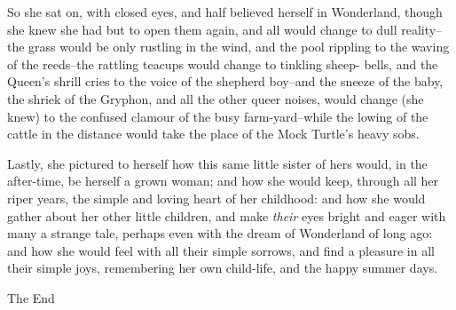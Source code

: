   So she sat on, with closed eyes, and half believed herself in
Wonderland, though she knew she had but to open them again, and
all would change to dull reality--the grass would be only
rustling in the wind, and the pool rippling to the waving of the
reeds--the rattling teacups would change to tinkling sheep-
bells, and the Queen's shrill cries to the voice of the shepherd
boy--and the sneeze of the baby, the shriek of the Gryphon, and
all the other queer noises, would change (she knew) to the
confused clamour of the busy farm-yard--while the lowing of the
cattle in the distance would take the place of the Mock Turtle's
heavy sobs.

  Lastly, she pictured to herself how this same little sister of
hers would, in the after-time, be herself a grown woman; and how
she would keep, through all her riper years, the simple and
loving heart of her childhood:  and how she would gather about
her other little children, and make {\it their} eyes bright and eager
with many a strange tale, perhaps even with the dream of
Wonderland of long ago:  and how she would feel with all their
simple sorrows, and find a pleasure in all their simple joys,
remembering her own child-life, and the happy summer days.
\bigskip
\centerline{\caps The End}
\bye
